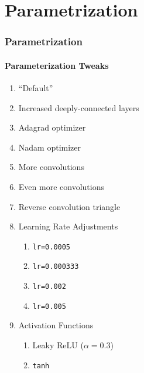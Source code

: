 \newcommand{\secttitle}{Parametrization}
\section{\secttitle}

\begin{frame}
	\frametitle{\secttitle}
	\framesubtitle{Parameterization Tweaks}
	\begin{enumerate}
		\item ``Default''
		\item Increased deeply-connected layers
		\item Adagrad optimizer
		\item Nadam optimizer
		\item More convolutions
		\item Even more convolutions
		\item Reverse convolution triangle
		\item Learning Rate Adjustments
			\begin{enumerate}
				\item \texttt{lr=0.0005}
				\item \texttt{lr=0.000333}
				\item \texttt{lr=0.002}
				\item \texttt{lr=0.005}
			\end{enumerate}
		\item Activation Functions
			\begin{enumerate}
				\item Leaky ReLU ($\alpha = 0.3$)
				\item \texttt{tanh}
			\end{enumerate}
	\end{enumerate}
\end{frame}

